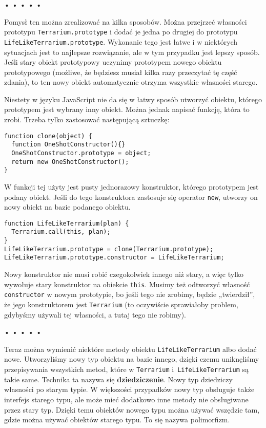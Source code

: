 \begin{center}
• • • • •
\end{center}

  
Pomysł ten można zrealizować na kilka sposobów. Można przejrzeć własności prototypu \texttt{Terrarium.prototype} i dodać je jedna po drugiej do prototypu \texttt{LifeLikeTerrarium.prototype}. Wykonanie tego jest łatwe i w niektórych sytuacjach jest to najlepsze rozwiązanie, ale w tym przypadku jest lepszy sposób. Jeśli stary obiekt prototypowy uczynimy prototypem nowego obiektu prototypowego (możliwe, że będziesz musiał kilka razy przeczytać tę część zdania), to ten nowy obiekt automatycznie otrzyma wszystkie własności starego.

  
Niestety w języku JavaScript nie da się w łatwy sposób utworzyć obiektu, którego prototypem jest wybrany inny obiekt. Można jednak napisać funkcję, która to zrobi. Trzeba tylko zastosować następującą sztuczkę:

  
\begin{verbatim} 
function clone(object) {
  function OneShotConstructor(){}
  OneShotConstructor.prototype = object;
  return new OneShotConstructor();
}
 \end{verbatim}
  
W funkcji tej użyty jest pusty jednorazowy konstruktor, którego prototypem jest podany obiekt. Jeśli do tego konstruktora zastosuje się operator \texttt{new}, utworzy on nowy obiekt na bazie podanego obiektu.

  
\begin{verbatim} 
function LifeLikeTerrarium(plan) {
  Terrarium.call(this, plan);
}
LifeLikeTerrarium.prototype = clone(Terrarium.prototype);
LifeLikeTerrarium.prototype.constructor = LifeLikeTerrarium;
 \end{verbatim}
  
Nowy konstruktor nie musi robić czegokolwiek innego niż stary, a więc tylko wywołuje stary konstruktor na obiekcie \texttt{this}. Musimy też odtworzyć własność \texttt{constructor} w nowym prototypie, bo jeśli tego nie zrobimy, będzie „twierdził”, że jego konstruktorem jest \texttt{Terrarium} (to oczywiście sprawiałoby problem, gdybyśmy używali tej własności, a tutaj tego nie robimy).


\begin{center}
• • • • •
\end{center}

  
Teraz można wymienić niektóre metody obiektu \texttt{LifeLikeTerrarium} albo dodać nowe. Utworzyliśmy nowy typ obiektu na bazie innego, dzięki czemu uniknęliśmy przepisywania wszystkich metod, które w \texttt{Terrarium} i~\texttt{LifeLikeTerrarium} są takie same. Technika ta nazywa się \textbf{dziedziczenie}. Nowy typ dziedziczy własności po starym typie. W większości przypadków nowy typ obsługuje także interfejs starego typu, ale może mieć dodatkowo inne metody nie obsługiwane przez stary typ. Dzięki temu obiektów nowego typu można używać wszędzie tam, gdzie można używać obiektów starego typu. To się nazywa polimorfizm.


